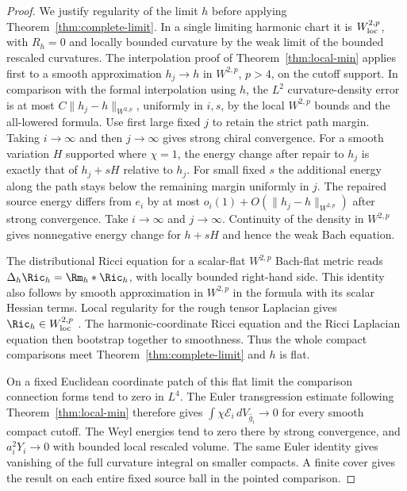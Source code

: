 \begin{proof}
We justify regularity of the limit \(h\) before applying
Theorem~\ref{thm:complete-limit}. In a single limiting harmonic
chart it is \(W^{2,p}_{\rm loc}\), with \(R_h=0\) and locally bounded
curvature by the weak limit of the bounded rescaled curvatures.
The interpolation proof of Theorem~\ref{thm:local-min} applies
first to a smooth approximation \(h_j\to h\) in \(W^{2,p}\),
\(p>4\), on the cutoff support. In comparison with the formal
interpolation using \(h\), the \(L^2\) curvature-density error is
at most \(C\|h_j-h\|_{W^{2,p}}\), uniformly in \(i,s\), by the
local \(W^{2,p}\) bounds and the all-lowered formula. Use first
large fixed \(j\) to retain the strict path margin. Taking \(i\to
\infty\) and then \(j\to\infty\) gives strong chiral convergence.
For a smooth variation \(H\) supported where \(\chi=1\), the energy
change after repair to \(h_j\) is exactly that of \(h_j+sH\)
relative to \(h_j\). For small fixed \(s\) the additional energy
along the path stays below the remaining margin uniformly in \(j\).
The repaired source energy differs from \(e_i\) by at most
\(o_i(1)+O(\|h_j-h\|_{W^{2,p}})\) after strong convergence.
Take \(i\to\infty\) and \(j\to\infty\). Continuity of the density
in \(W^{2,p}\) gives nonnegative energy change for \(h+sH\)
and hence the weak Bach equation.

The distributional Ricci equation for a scalar-flat \(W^{2,p}\)
Bach-flat metric reads \(\Delta_h\Ric_h=\Rm_h*\Ric_h\), with locally
bounded right-hand side. This identity also follows by smooth
approximation in \(W^{2,p}\) in the formula with its scalar
Hessian terms. Local regularity for the rough tensor Laplacian
gives \(\Ric_h\in W^{2,p}_{\rm loc}\)
\cite[Theorem 2.2(ii), Lemma 5.1]{AvalosCogoRoyoAbrego2026Bach}.
The harmonic-coordinate Ricci equation and the Ricci Laplacian
equation then bootstrap together to smoothness. Thus the whole
compact comparisons meet Theorem~\ref{thm:complete-limit} and
\(h\) is flat.

On a fixed Euclidean coordinate patch of this flat limit the
comparison connection forms tend to zero in \(L^4\). The Euler
transgression estimate following Theorem~\ref{thm:local-min}
therefore gives \(\int\chi\mathcal E_i\,dV_{\widehat g_i}\to0\)
for every smooth compact cutoff. The Weyl energies tend to zero
there by strong convergence, and \(a_i^2Y_i\to0\) with bounded
local rescaled volume. The same Euler identity gives vanishing
of the full curvature integral on smaller compacts. A finite
cover gives the result on each entire fixed source ball in the
pointed comparison.


\end{proof}
